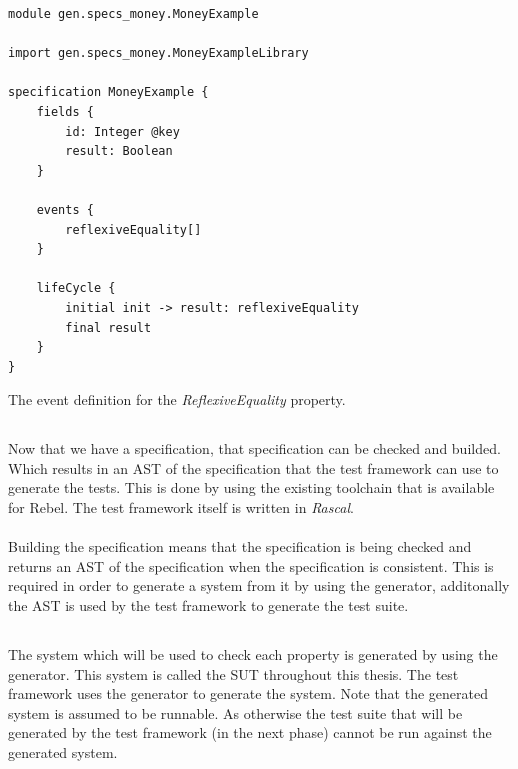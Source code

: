 \FloatBarrier
\begin{sourcecode}[h!]
\begin{lstlisting}[language=Rebel]
module gen.specs_money.MoneyExample

import gen.specs_money.MoneyExampleLibrary

specification MoneyExample {
	fields {
        id: Integer @key
		result: Boolean
	}

	events {
		reflexiveEquality[]
	}

	lifeCycle {
		initial init -> result:	reflexiveEquality
		final result
	}
}
\end{lstlisting}
\caption{The event definition for the \textit{ReflexiveEquality} property.}
\label{lst:ch3_rebel_specification_oneprop}
\end{sourcecode}
\FloatBarrier

\subsection{\tfPhaseTwo{}}
Now that we have a specification, that specification can be checked and builded. Which results in an AST of the specification that the test framework can use to generate the tests. This is done by using the existing toolchain that is available for Rebel. The test framework itself is written in \textit{Rascal}.\\
\\
Building the specification means that the specification is being checked and returns an AST of the specification when the specification is consistent. This is required in order to generate a system from it by using the generator, additonally the AST is used by the test framework to generate the test suite.

\subsection{\tfPhaseThree{}}
The system which will be used to check each property is generated by using the generator. This system is called the SUT throughout this thesis. The test framework uses the generator to generate the system. Note that the generated system is assumed to be runnable. As otherwise the test suite that will be generated by the test framework (in the next phase) cannot be run against the generated system.

